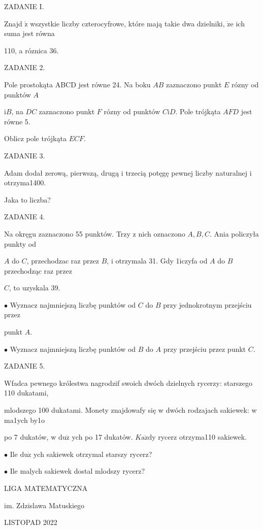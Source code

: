 \documentclass[a4paper,12pt]{article}
\begin{document}
ZADANIE I.

Znajd $\acute{\mathrm{z}}$ wszystkie liczby czterocyfrowe, które mają takie dwa dzielniki, $\dot{\mathrm{z}}\mathrm{e}$ ich suma jest równa

110, a róznica 36.

ZADANIE 2.

Pole prostokąta ABCD jest równe 24. Na boku $AB$ zaznaczono punkt $E$ rózny od punktów $A$

$\mathrm{i}B$, na $DC$ zaznaczono punkt $F$ rózny od punktów $C\mathrm{i}D$. Pole trójkąta $AFD$ jest równe 5.

Oblicz pole trójkąta $ECF.$

ZADANIE 3.

Adam dodał zerową, pierwszą, drugą i trzecią potęgę pewnej liczby naturalnej i otrzyma1400.

Jaka to liczba?

ZADANIE 4.

Na okręgu zaznaczono 55 punktów. Trzy z nich oznaczono $A, B, C$. Ania policzyła punkty od

$A$ do $C$, przechodzac raz przez $B$, i otrzymala 31. Gdy 1iczyfa od $A$ do $B$ przechodząc raz przez

$C$, to uzyskala 39.

$\bullet$ Wyznacz najmniejszą liczbę punktów od $C$ do $B$ przy jednokrotnym przejściu przez

punkt $A.$

$\bullet$ Wyznacz najmniejszą liczbę punktów od $B$ do $A$ przy przejściu przez punkt $C.$

ZADANIE 5.

Wfadca pewnego królestwa nagrodzif swoich dwóch dzielnych rycerzy: starszego 110 dukatami,

mlodszego 100 dukatami. Monety znajdowafy się w dwóch rodzajach sakiewek: w ma1ych by1o

po 7 dukatów, w $\mathrm{d}\mathrm{u}\dot{\mathrm{z}}$ ych po 17 dukatów. $K\mathrm{a}\dot{\mathrm{z}}\mathrm{d}\mathrm{y}$ rycerz otrzyma110 sakiewek.

$\bullet$ Ile $\mathrm{d}\mathrm{u}\dot{\mathrm{z}}$ ych sakiewek otrzymal starszy rycerz?

$\bullet$ Ile malych sakiewek dostal mlodszy rycerz?






LIGA MATEMATYCZNA

im. Zdzislawa Matuskiego

LISTOPAD 2022
\end{document}

